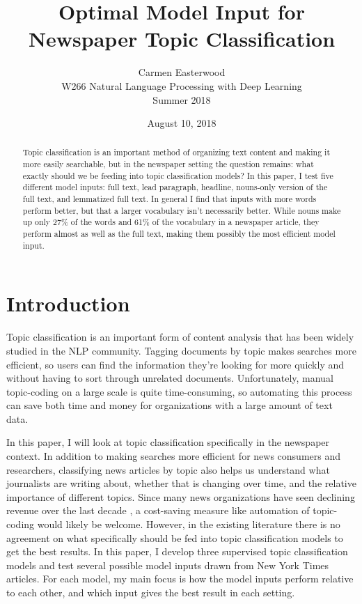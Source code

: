 \documentclass[11pt,a4paper,table]{article}
\title{Optimal Model Input for Newspaper Topic Classification}
\author{Carmen Easterwood \\
  W266 Natural Language Processing with Deep Learning \\
  Summer 2018 \\
}
\date{August 10, 2018}
\begin{document}
\maketitle

\begin{abstract}
Topic classification is an important method of organizing text content and making it more easily searchable, but in the newspaper setting the question remains: what exactly should we be feeding into topic classification models? In this paper, I test five different model inputs: full text, lead paragraph, headline, nouns-only version of the full text, and lemmatized full text. In general I find that inputs with more words perform better, but that a larger vocabulary isn't necessarily better. While nouns make up only 27\% of the words and 61\% of the vocabulary in a newspaper article, they perform almost as well as the full text, making them possibly the most efficient model input.
\end{abstract}

\section{Introduction}
\label{sec:intro}

Topic classification is an important form of content analysis that has been widely studied in the NLP community. Tagging documents by topic makes searches more efficient, so users can find the information they're looking for more quickly and without having to sort through unrelated documents. Unfortunately, manual topic-coding on a large scale is quite time-consuming, so automating this process can save both time and money for organizations with a large amount of text data.

In this paper, I will look at topic classification specifically in the newspaper context. In addition to making searches more efficient for news consumers and researchers, classifying news articles by topic also helps us understand what journalists are writing about, whether that is changing over time, and the relative importance of different topics. Since many news organizations have seen declining revenue over the last decade \cite{Pew}, a cost-saving measure like automation of topic-coding would likely be welcome. However, in the existing literature there is no agreement on what specifically should be fed into topic classification models to get the best results. In this paper, I develop three supervised topic classification models and test several possible model inputs drawn from New York Times articles. For each model, my main focus is how the model inputs perform relative to each other, and which input gives the best result in each setting.
\end{document}
